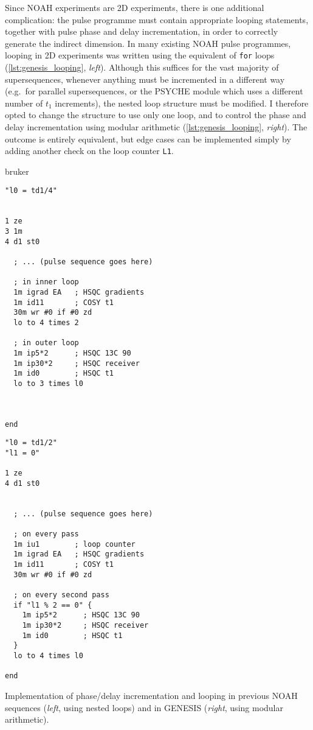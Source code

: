 Since NOAH experiments are 2D experiments, there is one additional complication: the pulse programme must contain appropriate looping statements, together with pulse phase and delay incrementation, in order to correctly generate the indirect dimension.
In many existing NOAH pulse programmes, looping in 2D experiments was written using the equivalent of \texttt{for} loops (\cref{lst:genesis_looping}, \textit{left}).
Although this suffices for the vast majority of supersequences, whenever anything must be incremented in a different way (e.g.\ for parallel supersequences, or the PSYCHE module which uses a different number of $t_1$ increments), the nested loop structure must be modified.
I therefore opted to change the structure to use only one loop, and to control the phase and delay incrementation using modular arithmetic (\cref{lst:genesis_looping}, \textit{right}).
The outcome is entirely equivalent, but edge cases can be implemented simply by adding another check on the loop counter \texttt{L1}.

\begin{mylisting}[!ht] %
\begin{tcbmintedsbs}{bruker}
\begin{verbatim}
"l0 = td1/4"


1 ze
3 1m
4 d1 st0

  ; ... (pulse sequence goes here)

  ; in inner loop
  1m igrad EA   ; HSQC gradients
  1m id11       ; COSY t1
  30m wr #0 if #0 zd
  lo to 4 times 2

  ; in outer loop
  1m ip5*2      ; HSQC 13C 90
  1m ip30*2     ; HSQC receiver
  1m id0        ; HSQC t1
  lo to 3 times l0



end
\end{verbatim}
\tcblower
\begin{verbatim}
"l0 = td1/2"
"l1 = 0"

1 ze
4 d1 st0


  ; ... (pulse sequence goes here)

  ; on every pass
  1m iu1        ; loop counter
  1m igrad EA   ; HSQC gradients
  1m id11       ; COSY t1
  30m wr #0 if #0 zd

  ; on every second pass
  if "l1 % 2 == 0" {
    1m ip5*2      ; HSQC 13C 90
    1m ip30*2     ; HSQC receiver
    1m id0        ; HSQC t1
  }
  lo to 4 times l0

end
\end{verbatim}
\end{tcbmintedsbs}
    \caption[GENESIS implementation of looping]{Implementation of phase/delay incrementation and looping in previous NOAH sequences (\textit{left}, using nested loops) and in GENESIS (\textit{right}, using modular arithmetic).}
    \label{lst:genesis_looping}
\end{mylisting} %


